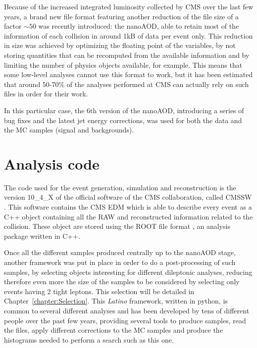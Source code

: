 \documentclass[a4paper, 10pt, openright]{report}
\begin{document}
Because of the increased integrated luminosity collected by \ac{CMS} over the last few years, a brand new file format featuring another reduction of the file size of a factor $\sim 50$ was recently introduced: the nanoAOD, able to retain most of the information of each collision in around 1kB of data per event only. This reduction in size was achieved by optimizing the floating point of the variables, by not storing quantities that can be recomputed from the available information and by limiting the number of physics objects available, for example. This means that some low-level analyses cannot use this format to work, but it has been estimated that around 50-70\% of the analyses performed at \ac{CMS} can actually rely on such files in order for their work. 

In this particular case, the 6th version of the nanoAOD, introducing a series of bug fixes and the latest jet energy corrections, was used for both the data and the \ac{MC} samples (signal and backgrounds). 

\section{Analysis code} \label{section:Code}

The code used for the event generation, simulation and reconstruction is the version 10\_4\_X of the official software of the \ac{CMS} collaboration, called CMSSW \cite{CMSSW}. This software contains the \ac{CMS} \ac{EDM} which is able to describe every event as a C++ object containing all the RAW and reconstructed information related to the collision. These object are stored using the ROOT file format \cite{ROOT}, an analysis package written in C++. 

Once all the different samples produced centrally up to the nanoAOD stage, another framework was put in place in order to do a post-processing of such samples, by selecting objects interesting for different dileptonic analyses, reducing therefore even more the size of the samples to be considered by selecting only events having 2 tight leptons. This selection will be detailed in Chapter~\ref{chapter:Selection}. This \textit{Latino} framework, written in python, is common to several different analyses and has been developed by tens of different people over the past few years, providing several tools to produce samples, read the files, apply different corrections to the \ac{MC} samples and produce the histograms needed to perform a search such as this one.
\end{document}
